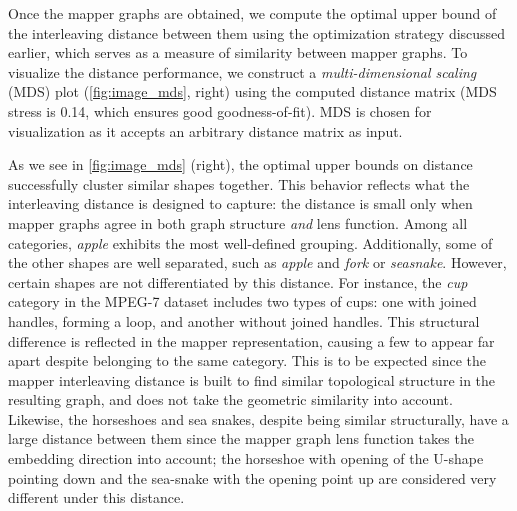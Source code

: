 Once the mapper graphs are obtained, we compute the optimal upper bound of the interleaving distance between them using the optimization strategy discussed earlier, which serves as a measure of similarity between mapper graphs. 
To visualize the distance performance, we construct a {\it multi-dimensional scaling} (MDS) \cite{borg2007modern} plot (\cref{fig:image_mds}, right) using the computed distance matrix (MDS stress is 0.14, which ensures good goodness-of-fit). 
MDS is chosen for visualization as it accepts an arbitrary distance matrix as input. 

As we see in \cref{fig:image_mds} (right), the optimal upper bounds on distance successfully cluster similar shapes together. 
This behavior reflects what the interleaving distance is designed to capture: the distance is small only when mapper graphs agree in both graph structure \emph{and} lens function. 
Among all categories, {\it apple} exhibits the most well-defined grouping. 
Additionally, some of the other shapes are well separated, such as {\it apple} and {\it fork} or {\it seasnake}.
However, certain shapes are not differentiated by this distance. 
For instance, the {\it cup} category in the MPEG-7 dataset includes two types of cups: one with joined handles, forming a loop, and another without joined handles. 
This structural difference is reflected in the mapper representation, causing a few to appear far apart despite belonging to the same category.  
This is to be expected since the mapper interleaving distance is built to find similar topological structure in the resulting graph, and does not take the geometric similarity into account. 
Likewise, the horseshoes and sea snakes, despite being similar structurally, have a large distance between them since the mapper graph lens function takes the embedding direction into account; the horseshoe with opening of the U-shape pointing down and the sea-snake with the opening point up are considered very different under this distance. 


